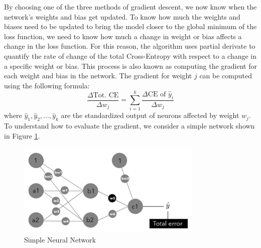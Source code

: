 By choosing one of the three methods of gradient descent, we now know when the network's weights and bias get updated. To know how much the weights and biases need to be updated to bring the model closer to the global minimum of the loss function, we need to know how much a change in weight or bias affects a change in the loss function. For this reason, the algorithm uses partial derivate to quantify the rate of change of the total Cross-Entropy with respect to a change in a specific weight or bias. This process is also known as computing the gradient for each weight and bias in the network. The gradient for weight $j$ can be computed using the following formula:
\[
    \frac{\Delta \text{Tot. CE}}{\Delta w_j}= \sum^k_{i=1}\frac{\Delta \text{CE of }\hat{y}_i}{\Delta w_j}
\]
where $\hat{y}_1, \hat{y}_2, ..., \hat{y}_k$ are the standardized output of neurons affected by weight $w_j$. To understand how to evaluate the gradient, we consider a simple network shown in Figure \ref{fig:gradient_nn}.
%
\begin{figure}[H]
    \centering
    \includegraphics[width=3.5in]{figures/simple_nn_gradient.png}
    \caption{Simple Neural Network \cite{taylor2017neural}} \label{fig:gradient_nn}
\end{figure}

